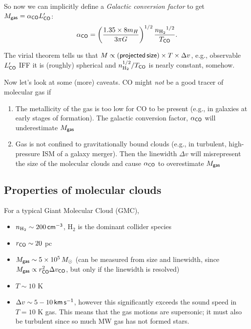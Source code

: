 \documentclass{tufte-handout}
\renewcommand{\rm}{\sf}
\renewcommand{\textrm}{\textsf}
\newcommand{\Htwo}{\textnormal{H$_2$}}
\newcommand{\e}[1]{\times 10^{#1}}
\begin{document}
So now we can implicitly define a \textit{Galactic conversion factor} to get $M_{\rm gas} = \alpha_{\rm CO} L_{\rm CO}'$:
\begin{equation}
\alpha_{\rm CO} = \left (\frac{1.35 \times 8 m_H}{3\pi G}\right )^{1/2} \frac{n_\Htwo{}^{1/2}}{T_{\rm CO}}.
\end{equation}

The virial theorem tells us that $M \propto (\textrm{projected\,size}) \times T \times \Delta v$, e.g., observable $L_{\rm CO}'$ IFF it is (roughly) spherical and $n_{\Htwo}^{1/2}/T_{\rm CO}$ is nearly constant, somehow.

Now let's look at some (more) caveats. CO might \textit{not} be a good tracer of molecular gas if
\begin{enumerate}
\item The metallicity of the gas is too low for CO to be present (e.g., in galaxies at early stages of formation). The galactic conversion factor, $\alpha_{\rm CO}$ will underestimate $M_{\rm gas}$
\item Gas is not confined to gravitationally bound clouds (e.g., in turbulent, high-pressure ISM of a galaxy merger). Then the linewidth $\Delta v$ will misrepresent the size of the molecular clouds and cause $\alpha_{\rm CO}$ to overestimate $M_{\rm gas}$
\end{enumerate}

\subsection{Properties of molecular clouds}
For a typical Giant Molecular Cloud (GMC),
\begin{itemize}
\item $n_{\Htwo{}} \sim 200 {\rm \, cm^{-3}}$, \Htwo{} is the dominant collider species
\item $r_{\rm CO} \sim 20$ pc
\item $M_{\rm gas} \sim 5\e{5}\, M_\odot$ (can be measured from size and linewidth, since $M_{\rm gas} \propto r_{\rm CO}^2 \Delta v_{\rm CO}$, but only if the linewidth is resolved)
\item $T \sim 10$ K
\item $\Delta v \sim 5-10 \,{\rm km\, s^{-1}}$, however this significantly exceeds the sound speed in $T=10$ K gas.\sidenote{$c_s = (\gamma kT/ \mu m_H)^{1/2} \simeq 0.2 {\rm\, km\, s^{-1}}$} This means that the gas motions are supersonic; it must also be turbulent since so much MW gas has not formed stars.
\end{itemize}
\end{document}
